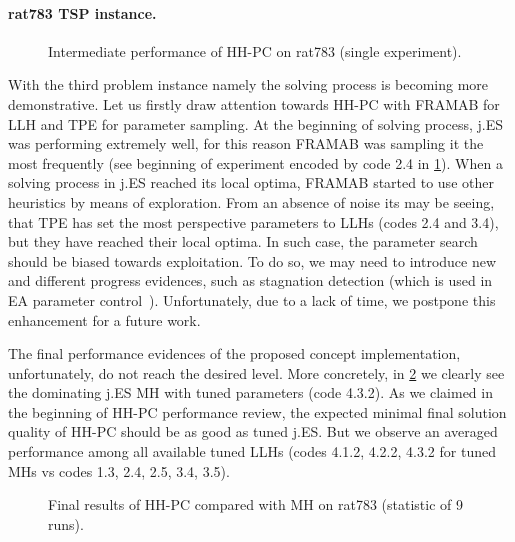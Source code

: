 \newpage
\paragraph{rat783 TSP instance.}
\begin{figure}[t]
	\centering
	\vspace{-20pt}
	
	\caption{Intermediate performance of HH-PC on rat783 (single experiment).}
	\vspace{-10pt}
	\label{eval:pict:hh-pc:rat783 intermediate}
\end{figure}
With the third problem instance namely the solving process is becoming more demonstrative.
Let us firstly draw attention towards HH-PC with FRAMAB for LLH and TPE for parameter sampling. At the beginning of solving process, j.ES was performing extremely well, for this reason FRAMAB was sampling it the most frequently (see beginning of experiment encoded by code 2.4 in \cref{eval:pict:hh-pc:rat783 intermediate}). When a solving process in j.ES reached its local optima, FRAMAB started to use other heuristics by means of exploration. From an absence of noise its may be seeing, that TPE has set the most perspective parameters to LLHs (codes 2.4 and 3.4), but they have reached their local optima. In such case, the parameter search should be biased towards exploitation. To do so, we may need to introduce new and different progress evidences, such as stagnation detection (which is used in EA parameter control~\cite{karafotias2014generic}). Unfortunately, due to a lack of time, we postpone this enhancement for a future work.

The final performance evidences of the proposed concept implementation, unfortunately, do not reach the desired level. More concretely, in \cref{eval:pict:hh-pc:rat783 final} we clearly see the dominating j.ES MH with tuned parameters (code 4.3.2). As we claimed in the beginning of HH-PC performance review, the expected minimal final solution quality of HH-PC should be as good as tuned j.ES. But we observe an averaged performance among all available tuned LLHs (codes 4.1.2, 4.2.2, 4.3.2 for tuned MHs vs codes 1.3, 2.4, 2.5, 3.4, 3.5).

\begin{figure}[b]
	\centering
	\vspace{-20pt}
	
	\caption{Final results of HH-PC compared with MH on rat783 (statistic of 9 runs).}
	\vspace{-5pt}
	\label{eval:pict:hh-pc:rat783 final}
\end{figure}

